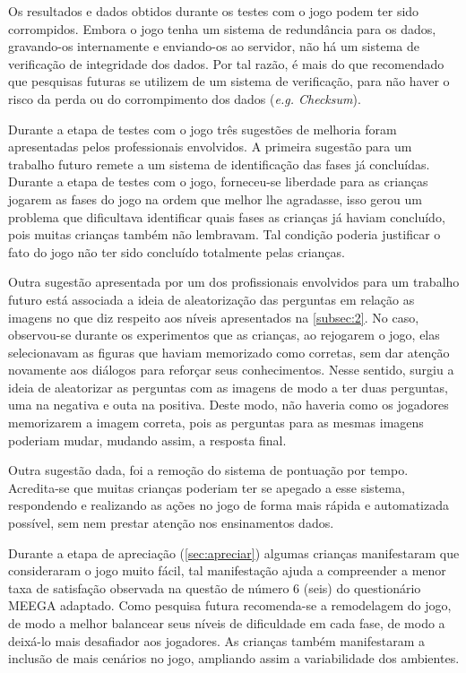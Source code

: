 Os resultados e dados obtidos durante os testes com o jogo podem ter sido corrompidos. Embora o jogo tenha um sistema de redundância para os dados, gravando-os internamente e enviando-os ao servidor, não há um sistema de verificação de integridade dos dados. Por tal razão, é mais do que recomendado que pesquisas futuras se utilizem de um sistema de verificação, para não haver o risco da perda ou do corrompimento dos dados (\textit{e.g. Checksum}).


Durante a etapa de testes com o jogo três sugestões de melhoria foram apresentadas pelos professionais envolvidos. A primeira sugestão para um trabalho futuro remete a um sistema de identificação das fases já concluídas. Durante a etapa de testes com o jogo, forneceu-se liberdade para as crianças jogarem as fases do jogo na ordem que melhor lhe agradasse, isso gerou um problema que dificultava identificar quais fases as crianças já haviam concluído, pois muitas crianças também não lembravam. Tal condição poderia justificar o fato do jogo não ter sido concluído totalmente pelas crianças. 

Outra sugestão apresentada por um dos profissionais envolvidos para um trabalho futuro está associada a ideia de aleatorização das perguntas em relação as imagens no que diz respeito aos níveis apresentados na \autoref{subsec:2}. No caso, observou-se durante os experimentos que as crianças, ao rejogarem o jogo, elas selecionavam as figuras que haviam memorizado como corretas, sem dar atenção novamente aos diálogos para reforçar seus conhecimentos. Nesse sentido, surgiu a ideia de aleatorizar as perguntas com as imagens de modo a ter duas perguntas, uma na negativa e outa na positiva. Deste modo, não haveria como os jogadores memorizarem a imagem correta, pois as perguntas para as mesmas imagens poderiam mudar, mudando assim, a resposta final. 

Outra sugestão dada, foi a remoção do sistema de pontuação por tempo. Acredita-se que muitas crianças poderiam ter se apegado a esse sistema, respondendo e realizando as ações no jogo de forma mais rápida e automatizada possível, sem nem prestar atenção nos ensinamentos dados. 

\newpage

Durante a etapa de apreciação (\autoref{sec:apreciar}) algumas crianças manifestaram que consideraram o jogo muito fácil, tal manifestação ajuda a compreender a menor taxa de satisfação observada na questão de número 6 (seis) do questionário \ac{MEEGA} adaptado. Como pesquisa futura recomenda-se a remodelagem do jogo, de modo a melhor balancear seus níveis de dificuldade em cada fase, de modo a deixá-lo mais desafiador aos jogadores. As crianças também manifestaram a inclusão de mais cenários no jogo, ampliando assim a variabilidade dos ambientes. 


